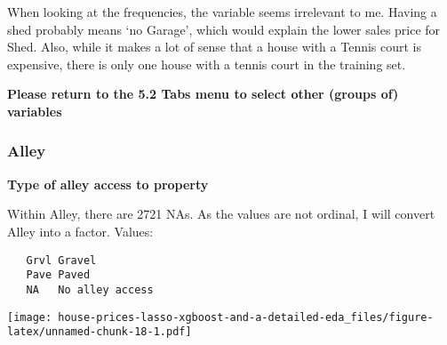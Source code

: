 \documentclass[]{article}
\newenvironment{Shaded}{\begin{snugshade}}{\end{snugshade}}
\newcommand{\KeywordTok}[1]{\textcolor[rgb]{0.13,0.29,0.53}{\textbf{#1}}}
\newcommand{\DataTypeTok}[1]{\textcolor[rgb]{0.13,0.29,0.53}{#1}}
\newcommand{\DecValTok}[1]{\textcolor[rgb]{0.00,0.00,0.81}{#1}}
\newcommand{\StringTok}[1]{\textcolor[rgb]{0.31,0.60,0.02}{#1}}
\newcommand{\OperatorTok}[1]{\textcolor[rgb]{0.81,0.36,0.00}{\textbf{#1}}}
\newcommand{\NormalTok}[1]{#1}
\begin{document}
When looking at the frequencies, the variable seems irrelevant to me.
Having a shed probably means `no Garage', which would explain the lower
sales price for Shed. Also, while it makes a lot of sense that a house
with a Tennis court is expensive, there is only one house with a tennis
court in the training set.

\textbf{Please return to the 5.2 Tabs menu to select other (groups of)
variables}

\subsubsection{Alley}\label{alley}

\textbf{Type of alley access to property}

Within Alley, there are 2721 NAs. As the values are not ordinal, I will
convert Alley into a factor. Values:

\begin{verbatim}
   Grvl Gravel
   Pave Paved
   NA   No alley access
\end{verbatim}

\begin{Shaded}
\end{Shaded}

\texttt{[image: house-prices-lasso-xgboost-and-a-detailed-eda\_files/figure-latex/unnamed-chunk-18-1.pdf]}
\end{document}
